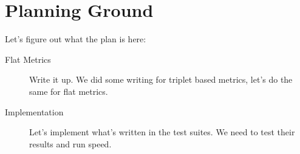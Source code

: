 
\section{Planning Ground}
Let's figure out what the plan is here:

\begin{description}
    \item[Flat Metrics] 
        Write it up.
        We did some writing for triplet based metrics, let's do the same for flat metrics.
    \item[Implementation] 
        Let's implement what's written in the test suites.
        We need to test their results and run speed.
\end{description}